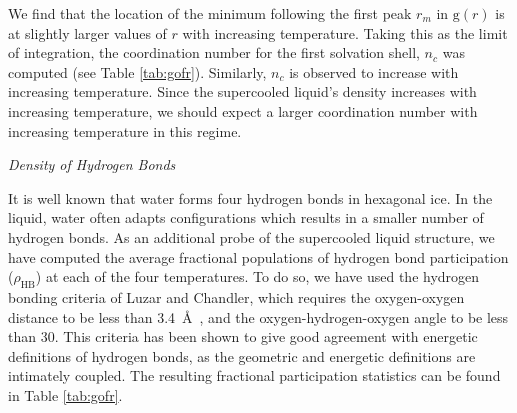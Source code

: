 We find that the location of the minimum following the first peak
$r_m$ in $\mathrm{g}(r)$ is at slightly larger values of $r$ with
increasing temperature. Taking this as the limit of integration, the
coordination number for the first solvation shell, $n_c$ was computed
(see Table \ref{tab:gofr}). Similarly, $n_c$ is observed to increase with
increasing temperature. Since the supercooled liquid's density
increases with increasing temperature, we should expect a larger
coordination number with increasing temperature in this regime.

\vspace{0.6cm}
\begin{flushleft}
\textit{Density of Hydrogen Bonds}
\end{flushleft}

It is well known that water forms four hydrogen bonds in hexagonal
ice. In the liquid, water often adapts configurations which results in
a smaller number of hydrogen bonds. As an additional probe of the
supercooled liquid structure, we have computed the average fractional
populations of hydrogen bond participation ($\rho_\mathrm{HB}$) at
each of the four temperatures. To do so, we have used the hydrogen
bonding criteria of Luzar and Chandler, which requires the
oxygen-oxygen distance to be less than 3.4~\AA~, and the
oxygen-hydrogen-oxygen angle to be less than
30\degree.\cite{Luzar1996} This criteria has been shown to give good
agreement with energetic definitions of hydrogen bonds, as the
geometric and energetic definitions are intimately coupled. The
resulting fractional participation statistics can be found in Table
\ref{tab:gofr}.



